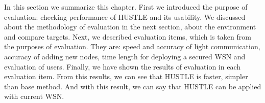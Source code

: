 In this section we summarize this chapter. First we introduced the purpose of evaluation: checking performance of HUSTLE and its usability. We discussed about the methodology of evaluation in the next section, about the environment and compare targets. Next, we described evaluation items, which is taken from the purposes of evaluation. They are: speed and accuracy of light communication, accuracy of adding new nodes, time length for deploying a secured WSN and evaluation of users. Finally, we have shown the results of evaluation in each evaluation item. From this results, we can see that HUSTLE is faster, simpler than base method. And with this result, we can say that HUSTLE can be applied with current WSN.
